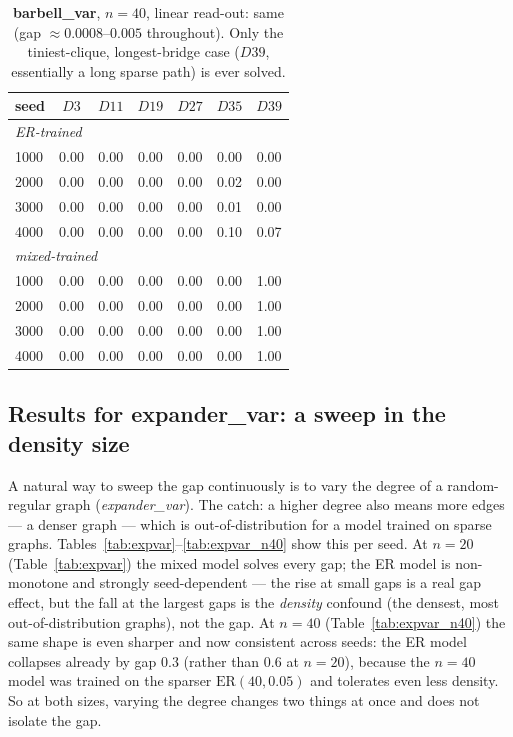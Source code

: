 \documentclass[11pt,a4paper]{article}
\begin{document}
\begin{table}[H]\centering\small
\begin{tabular}{lcccccc}
\toprule
seed & $D3$ & $D11$ & $D19$ & $D27$ & $D35$ & $D39$ \\
\midrule
\multicolumn{7}{l}{\emph{ER-trained}}\\
1000 & 0.00 & 0.00 & 0.00 & 0.00 & 0.00 & 0.00 \\
2000 & 0.00 & 0.00 & 0.00 & 0.00 & 0.02 & 0.00 \\
3000 & 0.00 & 0.00 & 0.00 & 0.00 & 0.01 & 0.00 \\
4000 & 0.00 & 0.00 & 0.00 & 0.00 & 0.10 & 0.07 \\
\midrule
\multicolumn{7}{l}{\emph{mixed-trained}}\\
1000 & 0.00 & 0.00 & 0.00 & 0.00 & 0.00 & 1.00 \\
2000 & 0.00 & 0.00 & 0.00 & 0.00 & 0.00 & 1.00 \\
3000 & 0.00 & 0.00 & 0.00 & 0.00 & 0.00 & 1.00 \\
4000 & 0.00 & 0.00 & 0.00 & 0.00 & 0.00 & 1.00 \\
\bottomrule\end{tabular}
\caption{\textbf{barbell\_var}, $n=40$, linear read-out: same (gap $\approx0.0008$--$0.005$ throughout). Only the
tiniest-clique, longest-bridge case ($D39$, essentially a long sparse path) is ever solved.}
\label{tab:bvdiam_n40}
\end{table}

\subsection{Results for expander\_var: a sweep in the density size}

A natural way to sweep the gap continuously is to vary the degree of a random-regular graph
(\emph{expander\_var}). The catch: a higher degree also means more edges --- a denser graph ---
which is out-of-distribution for a model trained on sparse graphs. Tables~\ref{tab:expvar}--\ref{tab:expvar_n40}
show this per seed. At $n=20$ (Table~\ref{tab:expvar}) the mixed model solves every gap; the ER
model is non-monotone and strongly seed-dependent --- the rise at small gaps is a real gap
effect, but the fall at the largest gaps is the \emph{density} confound (the densest, most
out-of-distribution graphs), not the gap. At $n=40$ (Table~\ref{tab:expvar_n40}) the same shape
is even sharper and now consistent across seeds: the ER model collapses already by gap $0.3$
(rather than $0.6$ at $n=20$), because the $n=40$ model was trained on the sparser
$\mathrm{ER}(40,0.05)$ and tolerates even less density. So at both sizes, varying the degree
changes two things at once and does not isolate the gap.
\end{document}
